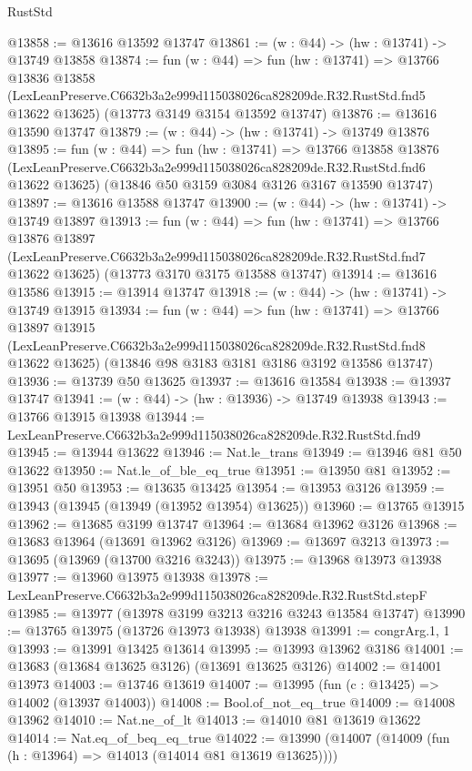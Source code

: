 \begin{lexlean}{RustStd}
\begin{coremodule}
@13858 := @13616 @13592 @13747
@13861 := (w : @44) -> (hw : @13741) -> @13749 @13858
@13874 := fun (w : @44) =>
  fun (hw : @13741) =>
  @13766
    @13836
    @13858
    (LexLeanPreserve.C6632b3a2e999d115038026ca828209de.R32.RustStd.fnd5 @13622 @13625)
    (@13773 @3149 @3154 @13592 @13747)
@13876 := @13616 @13590 @13747
@13879 := (w : @44) -> (hw : @13741) -> @13749 @13876
@13895 := fun (w : @44) =>
  fun (hw : @13741) =>
  @13766
    @13858
    @13876
    (LexLeanPreserve.C6632b3a2e999d115038026ca828209de.R32.RustStd.fnd6 @13622 @13625)
    (@13846 @50 @3159 @3084 @3126 @3167 @13590 @13747)
@13897 := @13616 @13588 @13747
@13900 := (w : @44) -> (hw : @13741) -> @13749 @13897
@13913 := fun (w : @44) =>
  fun (hw : @13741) =>
  @13766
    @13876
    @13897
    (LexLeanPreserve.C6632b3a2e999d115038026ca828209de.R32.RustStd.fnd7 @13622 @13625)
    (@13773 @3170 @3175 @13588 @13747)
@13914 := @13616 @13586
@13915 := @13914 @13747
@13918 := (w : @44) -> (hw : @13741) -> @13749 @13915
@13934 := fun (w : @44) =>
  fun (hw : @13741) =>
  @13766
    @13897
    @13915
    (LexLeanPreserve.C6632b3a2e999d115038026ca828209de.R32.RustStd.fnd8 @13622 @13625)
    (@13846 @98 @3183 @3181 @3186 @3192 @13586 @13747)
@13936 := @13739 @50 @13625
@13937 := @13616 @13584
@13938 := @13937 @13747
@13941 := (w : @44) -> (hw : @13936) -> @13749 @13938
@13943 := @13766 @13915 @13938
@13944 := LexLeanPreserve.C6632b3a2e999d115038026ca828209de.R32.RustStd.fnd9
@13945 := @13944 @13622
@13946 := Nat.le_trans
@13949 := @13946 @81 @50 @13622
@13950 := Nat.le_of_ble_eq_true
@13951 := @13950 @81
@13952 := @13951 @50
@13953 := @13635 @13425
@13954 := @13953 @3126
@13959 := @13943 (@13945 (@13949 (@13952 @13954) @13625))
@13960 := @13765 @13915
@13962 := @13685 @3199 @13747
@13964 := @13684 @13962 @3126
@13968 := @13683 @13964 (@13691 @13962 @3126)
@13969 := @13697 @3213
@13973 := @13695 (@13969 (@13700 @3216 @3243))
@13975 := @13968 @13973 @13938
@13977 := @13960 @13975 @13938
@13978 := LexLeanPreserve.C6632b3a2e999d115038026ca828209de.R32.RustStd.stepF
@13985 := @13977 (@13978 @3199 @3213 @3216 @3243 @13584 @13747)
@13990 := @13765 @13975 (@13726 @13973 @13938) @13938
@13991 := congrArg.{1, 1}
@13993 := @13991 @13425 @13614
@13995 := @13993 @13962 @3186
@14001 := @13683 (@13684 @13625 @3126) (@13691 @13625 @3126)
@14002 := @14001 @13973
@14003 := @13746 @13619
@14007 := @13995 (fun (c : @13425) => @14002 (@13937 @14003))
@14008 := Bool.of_not_eq_true
@14009 := @14008 @13962
@14010 := Nat.ne_of_lt
@14013 := @14010 @81 @13619 @13622
@14014 := Nat.eq_of_beq_eq_true
@14022 := @13990 (@14007 (@14009 (fun (h : @13964) => @14013 (@14014 @81 @13619 @13625))))

\end{coremodule}
\end{lexlean}
